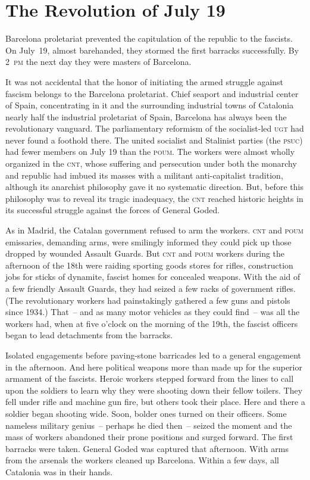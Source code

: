\chapter{The Revolution of July 19}

 Barcelona proletariat prevented the capitulation of the republic to the fascists. On July~19, almost barehanded, they stormed the first barracks successfully. By 2~\textsc{pm} the next day they were masters of Barcelona.

It was not accidental that the honor of initiating the armed struggle against fascism belongs to the Barcelona proletariat. Chief seaport and industrial center of Spain, concentrating in it and the surrounding industrial towns of Catalonia nearly half the industrial proletariat of Spain, Barcelona has always been the revolutionary vanguard. The parliamentary reformism of the socialist-led \textsc{ugt} had never found a foothold there. The united socialist and Stalinist parties (the \textsc{psuc}) had fewer members on July 19 than the \textsc{poum}. The workers were almost wholly organized in the \textsc{cnt}, whose suffering and persecution under both the monarchy and republic had imbued its masses with a militant anti-capitalist tradition, although its anarchist philosophy gave it no systematic direction. But, before this philosophy was to reveal its tragic inadequacy, the \textsc{cnt} reached historic heights in its successful struggle against the forces of General Goded.

As in Madrid, the Catalan government refused to arm the workers. \textsc{cnt} and \textsc{poum} emissaries, demanding arms, were smilingly informed they could pick up those dropped by wounded Assault Guards.
But \textsc{cnt} and \textsc{poum} workers during the afternoon of the 18th were raiding sporting goods stores for rifles, construction jobs for sticks of dynamite, fascist homes for concealed weapons. With the aid of a few friendly Assault Guards, they had seized a few racks of government rifles. (The revolutionary workers had painstakingly gathered a few guns and pistols since 1934.) That~-- and as many motor vehicles as they could find~-- was all the workers had, when at five o’clock on the morning of the 19th, the fascist officers began to lead detachments from the barracks.

Isolated engagements before paving-stone barricades led to a general engagement in the afternoon. And here political weapons more than made up for the superior armament of the fascists. Heroic workers stepped forward from the lines to call upon the soldiers to learn why they were shooting down their fellow toilers. They fell under rifle and machine gun fire, but others took their place. Here and there a soldier began shooting wide. Soon, bolder ones turned on their officers. Some nameless military genius~-- perhaps he died then~-- seized the moment and the mass of workers abandoned their prone positions and surged forward. The first barracks were taken. General Goded was captured that afternoon. With arms from the arsenals the workers cleaned up Barcelona. Within a few days, all Catalonia was in their hands.

